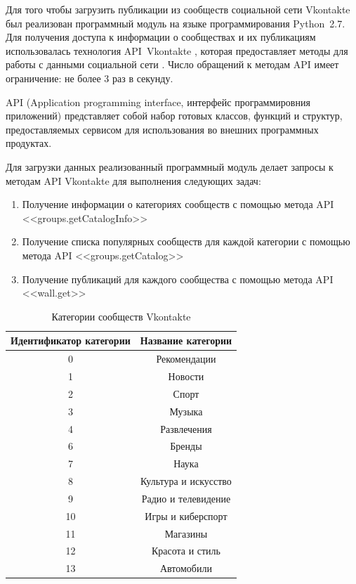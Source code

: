\documentclass[a4paper]{report}
\begin{document}
	
	Для того чтобы загрузить публикации из сообществ социальной сети Vkontakte был реализован программный модуль на языке программирования Python~2.7. 
	Для получения доступа к информации о сообществах и их публикациям использовалась технология API~Vkontakte \cite{bib:vkapi}, которая предоставляет методы для работы с данными социальной сети \cite{bib:methods}. Число обращений к методам API имеет ограничение: не более 3 раз в секунду.
	
	API (Application programming interface, интерфейс программировния приложений) представляет собой набор готовых классов, функций и структур, предоставляемых сервисом для использования во внешних программных продуктах. 
	
	Для загрузки данных реализованный программный модуль делает запросы к методам API Vkontakte для выполнения следующих задач:
	
	\begin{enumerate}
	\item{Получение информации о категориях сообществ с помощью метода API <<groups.getCatalogInfo>>}
	\item{Получение списка популярных сообществ для каждой категории с помощью метода API <<groups.getCatalog>> }
	\item{Получение публикаций для каждого сообщества с помощью метода API <<wall.get>>}
	
	\end{enumerate}
	
	\setlength\extrarowheight{5pt}
\begin{table}[t]
\centering
\begin{tabular}{|c|c|}
\hline
\textbf{Идентификатор категории} & \textbf{Название категории} \\  \hline 
0 & Рекомендации \\ \hline
1 & Новости \\ \hline
2 & Спорт \\ \hline
3 & Музыка \\ \hline
4 & Развлечения \\ \hline
6 & Бренды \\ \hline
7 & Наука \\ \hline
8 & Культура и искусство \\ \hline
9 & Радио и телевидение \\ \hline
10 & Игры и киберспорт \\ \hline
11 & Магазины \\ \hline
12 & Красота и стиль \\ \hline
13 & Автомобили \\ \hline
\end{tabular}
\caption{Категории сообществ Vkontakte}
\label{table1}
\end{table}
\end{document}
